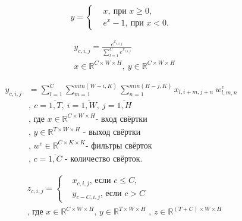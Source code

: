 \documentclass[14pt, a4paper, oneside, bold]{extarticle}
\begin{document}
\begin{equation} \label{ELU}
	y = \begin{cases} 
		& x ,\ \text{при $x \geq 0$}, \\	
		& e^x - 1 ,\ \text{при $x < 0$}.
	\end{cases}
\end{equation}

\begin{equation} \label{softmax}
\begin{aligned}
	& y_{c, i, j} = \frac{ e^{x_{c, i, j}} }
		{ \sum \limits_{l=1}^{C} e^{x_{l, i, j}} } \\
	& x \in \mathbb{R}^{C \times W \times H}
		,\ y \in \mathbb{R}^{C \times W \times H}
\end{aligned}
\end{equation}

\begin{equation} \label{conv}
\begin{aligned}
	y_{c, i, j} & = \sum \limits_{l=1}^{C} 
		\sum \limits_{m=1}^{min(W - i, K)}
		\sum \limits_{n=1}^{min(H - j, K)} 
		x_{l, i + m, j + n} \ w^c_{l, m, n} \\
	& ,\ c = \overline{1, T} 
		,\ i = \overline{1, W}
		,\ j = \overline{1, H} \\
	& \text{, где $x \in \mathbb{R}^{C \times W \times H}$
		- вход свёртки} \\
	& \text{, $y \in \mathbb{R}^{T \times W \times H}$ 
		- выход свёртки} \\
	& \text{, $w^c \in \mathbb{R}^{C \times K \times K}$
		- фильтры свёрток} \\
	& \text{, $c=\overline{1, C}$ - количество свёрток}.
\end{aligned}
\end{equation}

\begin{equation} \label{concat}
\begin{aligned}
	& z_{c, i, j} = \begin{cases}
		& x_{c, i, j} \text{, если $c \leq C$,} \\
		& y_{c - C, i, j} \text{, если $c > C$}
	\end{cases} \\
	& \text{, где $x \in \mathbb{R}^{C \times W \times H}$
	,\ $y \in \mathbb{R}^{T \times W \times H}$ 
	,\ $z \in \mathbb{R}^{(T + C) \times W \times H}$}
\end{aligned}
\end{equation}
\end{document}
